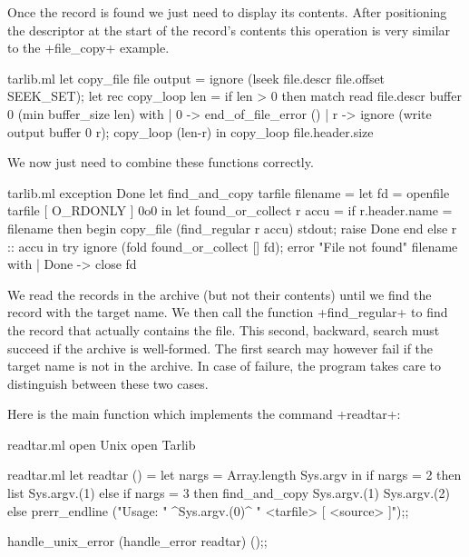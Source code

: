Once the record is found we just need to display its contents. After
positioning the descriptor at the start of the record's contents this
operation is very similar to the \ml+file_copy+ example.
\begin{listingcodefile}{tarlib.ml}
let copy_file file output = 
  ignore (lseek file.descr file.offset SEEK_SET);
  let rec copy_loop len =
    if len > 0 then
      match read file.descr buffer 0 (min buffer_size len) with
      | 0 -> end_of_file_error ()
      | r -> ignore (write output buffer 0 r); copy_loop (len-r) in
  copy_loop file.header.size
\end{listingcodefile}
We now just need to combine these functions correctly.
\begin{listingcodefile}{tarlib.ml}
exception Done
let find_and_copy tarfile filename =
  let fd = openfile tarfile [ O_RDONLY ] 0o0 in
  let found_or_collect r accu = 
    if r.header.name = filename then begin 
      copy_file (find_regular r accu) stdout;
      raise Done
    end else r :: accu in
  try 
     ignore (fold found_or_collect [] fd); 
     error "File not found" filename
  with
  | Done -> close fd 
\end{listingcodefile}
We read the records in the archive (but not their contents) until we
find the record with the target name. We then call the function
\ml+find_regular+ to find the record that actually contains the file.
This second, backward, search must succeed if the archive is
well-formed. The first search may however fail if the target name is
not in the archive. In case of failure, the program takes care to
distinguish between these two cases.

Here is the main function which implements the command \ml+readtar+:
\begin{codefile}{readtar.ml}
open Unix
open Tarlib
\end{codefile}
\begin{listingcodefile}{readtar.ml}
let readtar () =
  let nargs = Array.length Sys.argv in 
  if nargs = 2 then list Sys.argv.(1)
  else if nargs = 3 then find_and_copy Sys.argv.(1) Sys.argv.(2)
  else 
    prerr_endline ("Usage: " ^Sys.argv.(0)^ " <tarfile> [ <source> ]");;

handle_unix_error (handle_error readtar) ();;
\end{listingcodefile}

